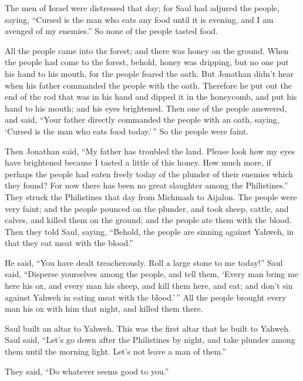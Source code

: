  The men of Israel were distressed that day; for Saul had
adjured the people, saying, ``Cursed is the man who eats any food until
it is evening, and I am avenged of my enemies.'' So none of the people
tasted food.

 All the people came into the forest; and there was honey
on the ground.  When the people had come to the forest,
behold, honey was dripping, but no one put his hand to his mouth, for
the people feared the oath.  But Jonathan didn't hear
when his father commanded the people with the oath. Therefore he put out
the end of the rod that was in his hand and dipped it in the honeycomb,
and put his hand to his mouth; and his eyes brightened. 
Then one of the people answered, and said, ``Your father directly
commanded the people with an oath, saying, `Cursed is the man who eats
food today.'\,'' So the people were faint.

 Then Jonathan said, ``My father has troubled the land.
Please look how my eyes have brightened because I tasted a little of
this honey.  How much more, if perhaps the people had
eaten freely today of the plunder of their enemies which they found? For
now there has been no great slaughter among the Philistines.''
 They struck the Philistines that day from Michmash to
Aijalon. The people were very faint;  and the people
pounced on the plunder, and took sheep, cattle, and calves, and killed
them on the ground; and the people ate them with the blood.
 Then they told Saul, saying, ``Behold, the people are
sinning against Yahweh, in that they eat meat with the blood.''

He said, ``You have dealt treacherously. Roll a large stone to me
today!''  Saul said, ``Disperse yourselves among the
people, and tell them, `Every man bring me here his ox, and every man
his sheep, and kill them here, and eat; and don't sin against Yahweh in
eating meat with the blood.'\,'' All the people brought every man his ox
with him that night, and killed them there.

 Saul built an altar to Yahweh. This was the first altar
that he built to Yahweh.  Saul said, ``Let's go down
after the Philistines by night, and take plunder among them until the
morning light. Let's not leave a man of them.''

They said, ``Do whatever seems good to you.''

